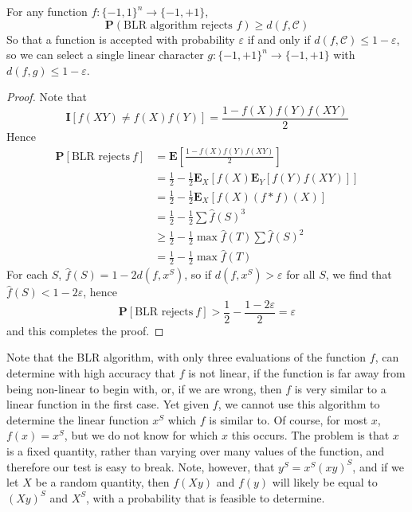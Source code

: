 \begin{theorem}
    For any function $f: \{ -1, 1 \}^n \to \{ -1, +1 \}$,
    \[ \mathbf{P}(\text{BLR algorithm rejects $f$}) \geq d(f, \mathcal{C}) \]
    So that a function is accepted with probability $\varepsilon$ if and only if $d(f,\mathcal{C}) \leq 1 - \varepsilon$, so we can select a single linear character $g: \{ -1, +1 \}^n \to \{ -1, +1 \}$ with $d(f,g) \leq 1 - \varepsilon$.
\end{theorem}
\begin{proof}
    Note that
    \[ \mathbf{I}[f(XY) \neq f(X)f(Y)] = \frac{1 - f(X)f(Y)f(XY)}{2} \]
    Hence
    \begin{align*}
        \mathbf{P}[\text{BLR rejects}\ f] &= \mathbf{E} \left[ \frac{1 - f(X)f(Y)f(XY)}{2} \right]\\
        &= \frac{1}{2} - \frac{1}{2} \mathbf{E}_X[f(X) \mathbf{E}_Y[f(Y) f(XY)]]\\
        &= \frac{1}{2} - \frac{1}{2} \mathbf{E}_X[f(X) (f * f)(X)]\\
        &= \frac{1}{2} - \frac{1}{2} \sum \widehat{f}(S)^3\\
        &\geq \frac{1}{2} - \frac{1}{2} \max \widehat{f}(T) \sum \widehat{f}(S)^2\\
        &= \frac{1}{2} - \frac{1}{2} \max \widehat{f}(T)
    \end{align*}
    For each $S$, $\widehat{f}(S) = 1 - 2 d(f, x^S)$, so if $d(f,x^S) > \varepsilon$ for all $S$, we find that $\widehat{f}(S) < 1 - 2 \varepsilon$, hence
    \[ \mathbf{P}[\text{BLR rejects}\ f] > \frac{1}{2} - \frac{1 - 2\varepsilon}{2} = \varepsilon \]
    and this completes the proof.
\end{proof}

Note that the BLR algorithm, with only three evaluations of the function $f$, can determine with high accuracy that $f$ is not linear, if the function is far away from being non-linear to begin with, or, if we are wrong, then $f$ is very similar to a linear function in the first case. Yet given $f$, we cannot use this algorithm to determine the linear function $x^S$ which $f$ is similar to. Of course, for most $x$, $f(x) = x^S$, but we do not know for which $x$ this occurs. The problem is that $x$ is a fixed quantity, rather than varying over many values of the function, and therefore our test is easy to break. Note, however, that $y^S = x^S (xy)^S$, and if we let $X$ be a random quantity, then $f(Xy)$ and $f(y)$ will likely be equal to $(Xy)^S$ and $X^S$, with a probability that is feasible to determine.

